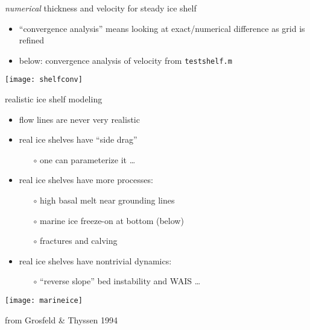 \begin{frame}{\emph{numerical} thickness and velocity for steady ice shelf}

\begin{itemize}
\item ``convergence analysis'' means looking at exact/numerical difference as grid is refined
\item below: convergence analysis of velocity from \texttt{testshelf.m}
\end{itemize}

\begin{center}
  \texttt{[image: shelfconv]}
\end{center}
\end{frame}


\begin{frame}{realistic ice shelf modeling}

\begin{itemize}
\item flow lines are never very realistic
\item real ice shelves have ``side drag''
  \begin{itemize}
  \item[$\circ$] one can parameterize it \dots
  \end{itemize}
\item real ice shelves have more processes:
  \begin{itemize}
  \item[$\circ$] high basal melt near grounding lines
  \item[$\circ$] marine ice freeze-on at bottom (below)
  \item[$\circ$] fractures and calving
  \end{itemize}
\item real ice shelves have nontrivial dynamics:
  \begin{itemize}
  \item[$\circ$] ``reverse slope'' bed instability and WAIS \dots
  \end{itemize}
\end{itemize}

\medskip
\begin{center}
  \texttt{[image: marineice]}
  
  \medskip
  \tiny from Grosfeld \& Thyssen 1994
\end{center}
\end{frame}


